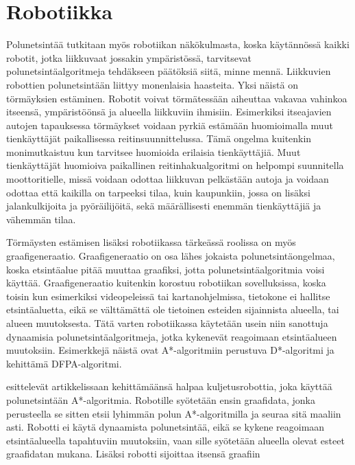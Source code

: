 \section{Robotiikka}\label{robotiikka}
Polunetsintää tutkitaan myös robotiikan näkökulmasta, koska käytännössä 
kaikki robotit, jotka liikkuvaat jossakin ympäristössä, tarvitsevat 
polunetsintäalgoritmeja tehdäkseen päätöksiä siitä, minne 
mennä.\cite{ProcediaAStar} Liikkuvien robottien polunetsintään liittyy 
monenlaisia haasteita. Yksi näistä on törmäyksien estäminen.\cite{ACMHindawi} 
Robotit voivat törmätessään aiheuttaa vakavaa vahinkoa itseensä, 
ympäristöönsä ja alueella liikkuviin ihmisiin.\cite{ProcediaAStar} Esimerkiksi 
itseajavien autojen tapauksessa törmäykset voidaan pyrkiä estämään 
huomioimalla muut tienkäyttäjät paikallisessa reitinsuunnittelussa. Tämä 
ongelma kuitenkin monimutkaistuu kun tarvitsee huomioida erilaisia 
tienkäyttäjiä. Muut tienkäyttäjät huomioiva paikallinen reitinhakualgoritmi on 
helpompi suunnitella moottoritielle, missä voidaan odottaa liikkuvan 
pelkästään autoja ja voidaan odottaa että kaikilla on tarpeeksi tilaa, kuin 
kaupunkiin, jossa on lisäksi jalankulkijoita ja pyöräilijöitä, sekä 
määrällisesti enemmän tienkäyttäjiä ja vähemmän tilaa.\cite{Lanelet2} \par
	Törmäysten estämisen lisäksi robotiikassa tärkeässä roolissa on myös 
graafigeneraatio. Graafigeneraatio on osa lähes jokaista polunetsintäongelmaa, 
koska etsintäalue pitää muuttaa graafiksi, jotta polunetsintäalgoritmia voisi 
käyttää. Graafigeneraatio kuitenkin korostuu robotiikan sovelluksissa, koska 
toisin kun esimerkiksi videopeleissä tai kartanohjelmissa, tietokone ei 
hallitse etsintäaluetta, eikä se välttämättä ole tietoinen esteiden 
sijainnista alueella, tai alueen muutoksesta. Tätä varten robotiikassa 
käytetään usein niin sanottuja dynaamisia polunetsintäalgoritmeja, jotka 
kykenevät reagoimaan etsintäalueen muutoksiin. Esimerkkejä näistä ovat 
A*-algoritmiin perustuva D*-algoritmi\cite{applSciLawande} ja 
\textcite{DelaunayVoronoiAStar} kehittämä DFPA-algoritmi. \par
	\textcite{transportRobotAStar} esittelevät artikkelissaan 
kehittämäänsä halpaa kuljetusrobottia, joka käyttää polunetsintään 
A*-algoritmia. Robotille syötetään ensin graafidata, jonka perusteella se 
sitten etsii lyhimmän polun A*-algoritmilla ja seuraa sitä maaliin asti. 
Robotti ei käytä dynaamista polunetsintää, eikä se kykene reagoimaan 
etsintäalueella tapahtuviin muutoksiin, vaan sille syötetään alueella olevat 
esteet graafidatan mukana. Lisäksi robotti sijoittaa itsensä graafiin 
